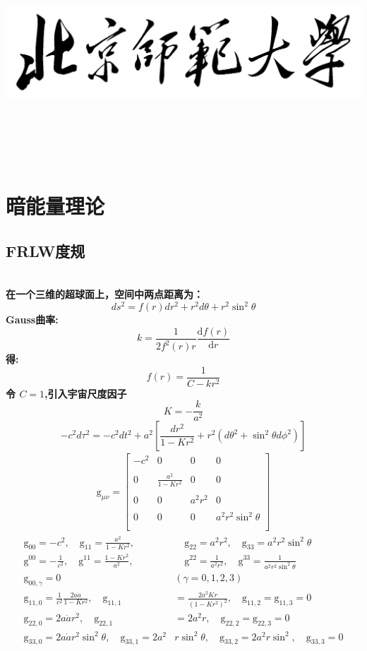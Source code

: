 \documentclass[14pt]{article}
\title{
    \begin{center}
      \includegraphics[scale=1.6]{BNU_name.jpg}
    \end{center}
    \vspace{2.5in}
    \Huge{\textbf{\hmwkClass}}\\
    \vspace{1in}
}
\author{\textbf{\hmwkAuthorNameCover}}
\date{}
\newcommand{\derivo}[2]{\frac{\mathrm{d} #1 }{\mathrm{d} #2}}
\newcommand{\g}{\mathrm{g}}
\begin{document}
\maketitle
\pagebreak
\tableofcontents
\pagebreak
\setcounter{page}{1}
\section{暗能量理论}

\subsection{FRLW度规}
\quad\\
\textbf{在一个三维的超球面上，空间中两点距离为：}
\[
ds^{2} = f(r)dr^{2}+r^{2}d\theta +r^{2}\sin^{2}\theta\tag{1.1.1}
\]
\textbf{Gauss曲率:}
\[
k=\frac{1}{2f^{2}(r)r}\derivo{f(r)}{r}\tag{1.1.2}
\]
\textbf{得:}
\[
f(r)=\frac{1}{C-kr^{2}} \tag{1.1.3}
\]
\textbf{令 $C=1$,引入宇宙尺度因子}
\[
K=-\frac{k}{a^{2}} \tag{1.1.4}
\]
\[
-c^{2}d\tau^{2} = -c^{2}dt^{2}+a^{2}[\displaystyle\frac{dr^{2}}{1-Kr^{2}}+r^{2}(d\theta^{2}+\sin^{2}\theta d\phi^{2})] \tag{1.1.5}
\]
\begin{align*}
\g_{\mu\nu}=
\left[
    \begin{array}{cccc}
        -c^{2} & 0 & 0 & 0\\\\
        0 & \frac{a^{2}}{1-Kr^{2}} & 0 & 0\\\\
        0 & 0 & a^{2}r^{2} & 0\\\\
        0 & 0 & 0 & a^{2}r^{2}\sin^{2}\theta\\\\
    \end{array}
\right]    \tag{1.1.6}
\end{align*}
\begin{align*}
\g_{00} = -c^{2},\quad \g_{11} = \frac{a^{2}}{1-Kr^{2}},&\quad \g_{22} = a^{2}r^{2},\quad \g_{33}=a^{2}r^{2}\sin^{2}\theta \tag{1.1.7}\\
\g^{00} = -\frac{1}{c^{2}},\quad \g^{11} = \frac{1-Kr^{2}}{a^{2}},&\quad \g^{22} = \frac{1}{a^{2}r^{2}},\quad \g^{33}=\frac{1}{a^{2}r^{2}\sin^{2}\theta} \tag{1.1.8}\\
\g_{00,\gamma} = 0 \quad& (\gamma = 0,1,2,3) \tag{1.1.9}\\
\g_{11,0} = \frac{1}{c^{2}}\frac{2a\dot{a}}{1-Kr^{2}},\quad\g_{11,1} &= \frac{2a^{2}Kr}{(1-Kr^{2})^{2}},\quad\g_{11,2} =\g_{11,3} =0\tag{1.1.10}\\
\g_{22,0} = 2a\dot{a}r^{2},\quad\g_{22,1}&=2a^{2}r,\quad\g_{22,2} =\g_{22,3} =0\tag{1.1.11}\\
\g_{33,0} = 2a\dot{a}r^{2}\sin^{2}\theta,\quad\g_{33,1}=2a^{2}&r\sin^{2}\theta,\quad\g_{33,2}=2a^{2}r\sin^{2},\quad\g_{33,3} =0\tag{1.1.12}\\
\end{align*}
\end{document}
